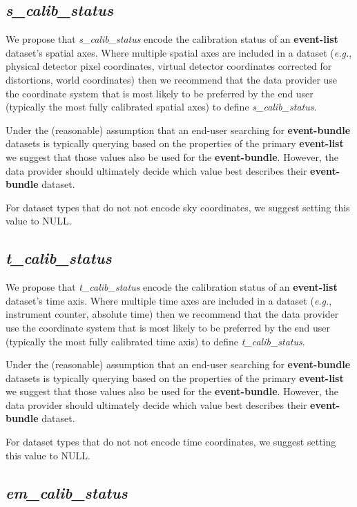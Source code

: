 \documentclass[11pt,a4paper]{ivoa}
\begin{document}
\subsection{{\em s\_calib\_status}}

We propose that {\em s\_calib\_status} encode the calibration status of an {\bf event-list} dataset's spatial axes.  Where multiple spatial axes are included in a dataset ({\em e.g.\/}, physical detector pixel coordinates, virtual detector coordinates corrected for distortions, world coordinates) then we recommend that the data provider use the coordinate system that is most likely to be preferred by the end user (typically the most fully calibrated spatial axes) to define {\em s\_calib\_status\/}.

Under the (reasonable) assumption that an end-user searching for {\bf event-bundle} datasets is typically querying based on the properties of the primary {\bf event-list} we suggest that those values also be used for the {\bf event-bundle}.  However, the data provider should ultimately decide which value best describes their {\bf event-bundle} dataset.  

For dataset types that do not not encode sky coordinates, we suggest setting this value to NULL\null.

\subsection{{\em t\_calib\_status}}

We propose that {\em t\_calib\_status}  encode the calibration status of an {\bf event-list} dataset's time axis.  Where multiple time axes are included in a dataset ({\em e.g.\/}, instrument counter, absolute time) then we recommend that the data provider use the coordinate system that is most likely to be preferred by the end user (typically the most fully calibrated time axis) to define {\em t\_calib\_status\/}.

Under the (reasonable) assumption that an end-user searching for {\bf event-bundle} datasets is typically querying based on the properties of the primary {\bf event-list} we suggest that those values also be used for the {\bf event-bundle}.  However, the data provider should ultimately decide which value best describes their {\bf event-bundle} dataset.  

For dataset types that do not not encode time coordinates, we suggest setting this value to NULL\null.

\subsection{{\em em\_calib\_status}}
\end{document}
